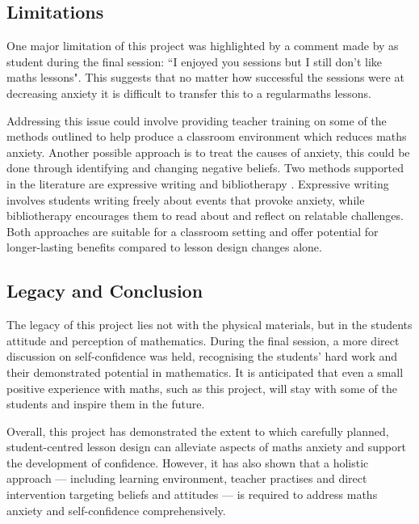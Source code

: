 \documentclass[11pt, a4paper, notitlepage]{article}
\begin{document}
\subsection{Limitations}
One major limitation of this project was highlighted by a comment made by as student during the final session: ``I enjoyed you sessions but I still don't like maths lessons". This suggests that no matter how successful the sessions were at decreasing anxiety it is difficult to transfer this to a regularmaths lessons.
\par
 Addressing this issue could involve providing teacher training on some of the methods outlined to help produce a classroom environment which reduces maths anxiety. Another possible approach is to treat the causes of anxiety, this could be done through identifying and changing negative beliefs. Two methods supported in the literature are expressive writing and bibliotherapy \cite{MAES:2024}. Expressive writing involves students writing freely about events that provoke anxiety, while bibliotherapy encourages them to read about and reflect on relatable challenges. Both approaches are suitable for a classroom setting and offer potential for longer-lasting benefits compared to lesson design changes alone.
 

\subsection{Legacy and Conclusion}

The legacy of this project lies not with the physical materials, but in the students attitude and perception of mathematics. During the final session, a more direct discussion on self-confidence was held, recognising the students' hard work and their demonstrated potential in mathematics. It is anticipated that even a small positive experience with maths, such as this project, will stay with some of the students and inspire them in the future.
\par
Overall, this project has demonstrated the extent to which carefully planned, student-centred lesson design can alleviate aspects of maths anxiety and support the development of confidence. However, it has also shown that a holistic approach --- including learning environment, teacher practises and direct intervention targeting beliefs and attitudes --- is required to address maths anxiety and self-confidence comprehensively.





\clearpage
\end{document}
